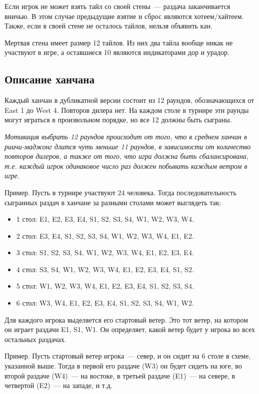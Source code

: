 \begin{additional}
Если игрок не может взять тайл со своей стены~--- раздача заканчивается вничью. В этом случае предыдущие взятие и сброс являются хотеем/хайтеем. Также, если в своей стене не осталось тайлов, нельзя объявить кан.

Мертвая стена имеет размер 12 тайлов. Из них два тайла вообще никак не участвуют в игре, а оставшиеся 10 являются индикаторами дор и урадор.

\subsection{Описание ханчана}

Каждый ханчан в дубликатной версии состоит из 12 раундов, обозначающихся от East 1 до West 4. Повторов дилера нет. На каждом столе в турнире эти раунды могут играться в произвольном порядке, но все 12 должны быть сыграны.

\textit{Мотивация выбрать 12 раундов происходит от того, что в среднем ханчан в риичи-маджонг длится чуть меньше 11 раундов, в зависимости от количество повторов дилеров, а также от того, что игра должна быть сбалансирована, т.е. каждый игрок одинаковое число раз должен побывать каждым ветром в игре.}

Пример. Пусть в турнире участвуют 24 человека. Тогда последовательность сыгранных раздач в ханчане за разными столами может выглядеть так:

\begin{itemize}
	\item 1 стол: E1, E2, E3, E4, S1, S2, S3, S4, W1, W2, W3, W4.
	\item 2 стол: E3, E4, S1, S2, S3, S4, W1, W2, W3, W4, E1, E2.
	\item 3 стол: S1, S2, S3, S4, W1, W2, W3, W4, E1, E2, E3, E4.
	\item 4 стол: S3, S4, W1, W2, W3, W4, E1, E2, E3, E4, S1, S2.
	\item 5 стол: W1, W2, W3, W4, E1, E2, E3, E4, S1, S2, S3, S4.
	\item 6 стол: W3, W4, E1, E2, E3, E4, S1, S2, S3, S4, W1, W2.
\end{itemize}

Для каждого игрока выделяется его стартовый ветер. Это тот ветер, на котором он играет раздачи E1, S1, W1. Он определяет, какой ветер будет у игрока во всех остальных раздачах.

Пример. Пусть стартовый ветер игрока~--- север, и он сидит на 6 столе в схеме, указанной выше. Тогда в первой его раздаче (W3) он будет сидеть на юге, во второй раздаче (W4)~--- на востоке, в третьей раздаче (E1)~--- на севере, в четвертой (E2)~--- на западе, и т.д.


\end{additional}
